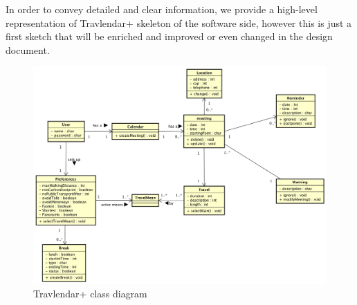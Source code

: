 
	In order to convey detailed and clear information, we provide a high-level representation of Travlendar+ skeleton of the software side, however this is just a first sketch that will be enriched and improved or even changed in the design document. \\



\begin{figure}[htp] 

\includegraphics[width=\textwidth]{classdiagrams/ClassDiagramTravlendar+} 
\caption{Travlendar+ class diagram} 
\label{fig:ux} 
\end{figure}